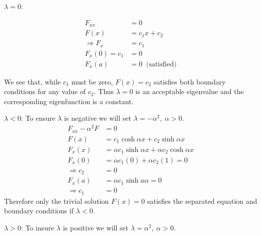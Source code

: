 \vspace{0.1cm}

\noindent\underline{$\lambda = 0$}:

\begin{align*}
F_{xx} &= 0 \\
F(x) &= c_1x + c_2 \\
\Rightarrow F_{x} &= c_1 \\
F_x(0) = c_1 &= 0 \\ 
F_{x}(a) &= 0 \ \text{ (satisfied)}
\end{align*}

\vspace{0.1cm}

\noindent We see that, while $c_1$ must be zero, $F(x)=c_2$ satisfies both boundary conditions for any value of $c_2$.  Thus $\lambda = 0$ is an acceptable eigenvalue and the corresponding eigenfunction is a constant.

\vspace{0.1cm}

\noindent\underline{$\lambda < 0$}: To ensure $\lambda$ is negative we will set $\lambda = -\alpha^2, \ \alpha>0$.
\begin{align*}
F_{xx} - \alpha^2 F &= 0 \\
F(x) &= c_1 \cosh{\alpha x} + c_2 \sinh{\alpha x} \\
F_x(x) &= \alpha c_1 \sinh{\alpha x} + \alpha c_2 \cosh{\alpha x} \\
F_x(0) &= \alpha c_1 (0) + \alpha c_2 (1) = 0 \\
\Rightarrow c_2 &= 0 \\
F_x(a) &= \alpha c_1 \sinh{a \alpha} = 0\\
\Rightarrow c_1 &= 0
\end{align*}
Therefore only the trivial solution $F(x)=0$ satisfies the separated equation and boundary conditions if $\lambda < 0$.

\vspace{0.5cm}

\noindent\underline{$\lambda > 0$}: To insure $\lambda$ is positive we will set $\lambda = \alpha^2, \ \alpha>0$.

